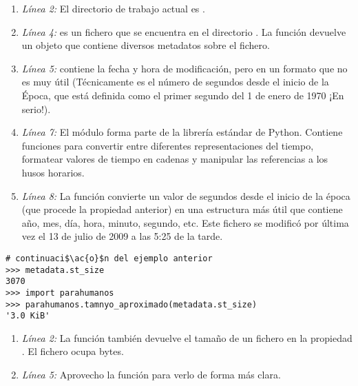 \begin{enumerate}

\item \emph{Línea 2:} El directorio de trabajo actual es .

\item \emph{Línea 4:}  es un fichero que se encuentra en el directorio . La función  devuelve un objeto que contiene diversos metadatos sobre el fichero.

\item \emph{Línea 5:}  contiene la fecha y hora de modificación, pero en un formato que no es muy útil (Técnicamente es el número de segundos desde el inicio de la Época, que está definida como el primer segundo del 1 de enero de 1970 ¡En serio!).

\item \emph{Línea 7:} El módulo  forma parte de la librería estándar de Python. Contiene funciones para convertir entre diferentes representaciones del tiempo, formatear valores de tiempo en cadenas y manipular las referencias a los husos horarios.

\item \emph{Línea 8:} La función  convierte un valor de segundos desde el inicio de la época (que procede la propiedad anterior) en una estructura más útil que contiene año, mes, día, hora, minuto, segundo, etc. Este fichero se modificó por última vez el 13 de julio de 2009 a las 5:25 de la tarde.

\end{enumerate}

\noindent\begin{minipage}{\textwidth}
\begin{lstlisting}[mathescape=True]
# continuaci$\ac{o}$n del ejemplo anterior
>>> metadata.st_size
3070
>>> import parahumanos
>>> parahumanos.tamnyo_aproximado(metadata.st_size)
'3.0 KiB'
\end{lstlisting}
\end{minipage}

\begin{enumerate}

\item \emph{Línea 2:} La función  también devuelve el tamaño de un fichero en la propiedad . El fichero  ocupa  bytes.

\item \emph{Línea 5:} Aprovecho la función  para verlo de forma más clara.

\end{enumerate}

